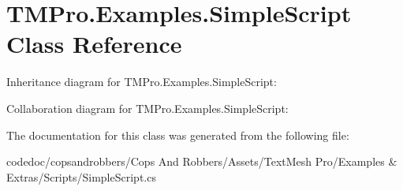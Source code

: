 \hypertarget{classTMPro_1_1Examples_1_1SimpleScript}{}\section{T\+M\+Pro.\+Examples.\+Simple\+Script Class Reference}
\label{classTMPro_1_1Examples_1_1SimpleScript}


Inheritance diagram for T\+M\+Pro.\+Examples.\+Simple\+Script\+:


Collaboration diagram for T\+M\+Pro.\+Examples.\+Simple\+Script\+:


The documentation for this class was generated from the following file\+:\begin{DoxyCompactItemize}
\item 
codedoc/copsandrobbers/\+Cops And Robbers/\+Assets/\+Text\+Mesh Pro/\+Examples \& Extras/\+Scripts/Simple\+Script.\+cs\end{DoxyCompactItemize}
